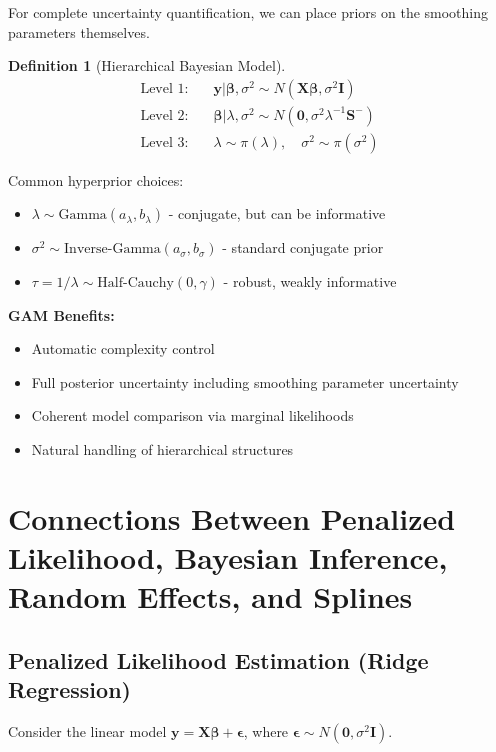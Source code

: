 \documentclass[12pt]{article}
\newtheorem{definition}{Definition}
\begin{document}
For complete uncertainty quantification, we can place priors on the smoothing parameters themselves.

\begin{definition}[Hierarchical Bayesian Model]
\begin{align}
\text{Level 1:} \quad & \mathbf{y} | \bm{\beta}, \sigma^2 \sim N(\mathbf{X}\bm{\beta}, \sigma^2\mathbf{I}) \\
\text{Level 2:} \quad & \bm{\beta} | \lambda, \sigma^2 \sim N(\mathbf{0}, \sigma^2\lambda^{-1}\mathbf{S}^{-}) \\
\text{Level 3:} \quad & \lambda \sim \pi(\lambda), \quad \sigma^2 \sim \pi(\sigma^2)
\end{align}
\end{definition}

Common hyperprior choices:
\begin{itemize}
    \item $\lambda \sim \text{Gamma}(a_\lambda, b_\lambda)$ - conjugate, but can be informative
    \item $\sigma^2 \sim \text{Inverse-Gamma}(a_\sigma, b_\sigma)$ - standard conjugate prior
    \item $\tau = 1/\lambda \sim \text{Half-Cauchy}(0, \gamma)$ - robust, weakly informative
\end{itemize}

\textbf{GAM Benefits:}
\begin{itemize}
    \item Automatic complexity control
    \item Full posterior uncertainty including smoothing parameter uncertainty
    \item Coherent model comparison via marginal likelihoods
    \item Natural handling of hierarchical structures
\end{itemize}

\section{Connections Between Penalized Likelihood, Bayesian Inference, Random Effects, and Splines}

\subsection{Penalized Likelihood Estimation (Ridge Regression)}

Consider the linear model $\mathbf{y} = \mathbf{X}\boldsymbol{\beta} + \boldsymbol{\epsilon}$, where $\boldsymbol{\epsilon} \sim N(\mathbf{0}, \sigma^2\mathbf{I})$.
\end{document}
